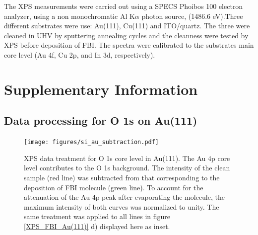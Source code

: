 \documentclass[aps,prl,reprint,longbibliography,superscriptaddress, english]{revtex4-1}
\begin{document}
The XPS measurements were carried out using a SPECS Phoibos 100 electron analyzer, using a non monochromatic Al K$\alpha$ photon source, (1486.6 eV).Three different substrates were use: Au(111), Cu(111) and  ITO/quartz. The three were cleaned in UHV by sputtering annealing cycles and the cleanness were tested by XPS before deposition of FBI. The spectra were calibrated to the substrates main core level (Au 4f, Cu 2p, and In 3d, respectively). 

 



\section{Supplementary Information}
\subsection{Data processing for O 1s on Au(111)}
\begin{figure}[ht!]
	\texttt{[image: figures/si\_au\_subtraction.pdf]}
	\caption{\label{Au_subtraction} 
    XPS data treatment for O 1s core level in Au(111). The Au 4p core level contributes to the O 1s background. The intensity of the clean sample (red line) was subtracted from that corresponding to the deposition of FBI molecule (green line). To account for the attenuation of the Au 4p peak after evaporating the molecule, the maximum intensity of both curves was normalized to unity. The same treatment was applied to all lines in figure \ref{XPS_FBI_Au(111)} d) displayed here as inset.}
\end{figure}  


\end{document}
